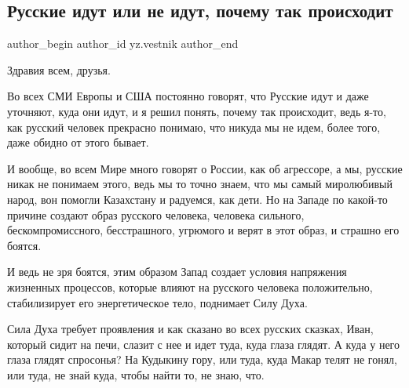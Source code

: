  
 
 
 
 
\subsection{Русские идут или не идут, почему так происходит}
\label{sec:11_01_2022.yz.vestnik.1.russkie_idut}

\ifcmt
 author_begin
   author_id yz.vestnik
 author_end
\fi

Здравия всем, друзья.

Во всех СМИ Европы и США постоянно говорят, что Русские идут и даже уточняют,
куда они идут, и я решил понять, почему так происходит, ведь я-то, как русский
человек прекрасно понимаю, что никуда мы не идем, более того, даже обидно от
этого бывает.


И вообще, во всем Мире много говорят о России, как об агрессоре, а мы, русские
никак не понимаем этого, ведь мы то точно знаем, что мы самый миролюбивый
народ, вон помогли Казахстану и радуемся, как дети. Но на Западе по какой-то
причине создают образ русского человека, человека сильного, бескомпромиссного,
бесстрашного, угрюмого и верят в этот образ, и страшно его боятся.

И ведь не зря боятся, этим образом Запад создает условия напряжения жизненных
процессов, которые влияют на русского человека положительно, стабилизирует его
энергетическое тело, поднимает Силу Духа.

\begin{zznagolos}
Сила Духа требует проявления и как сказано во всех русских сказках, Иван,
который сидит на печи, слазит с нее и идет туда, куда глаза глядят. А куда у
него глаза глядят спросонья? На Кудыкину гору, или туда, куда Макар телят не
гонял, или туда, не знай куда, чтобы найти то, не знаю, что.	
\end{zznagolos}

